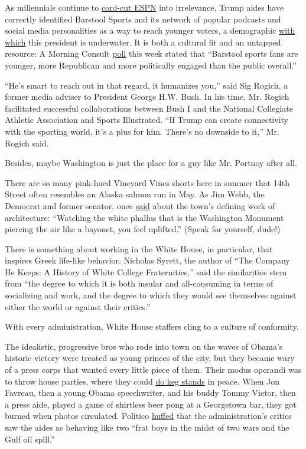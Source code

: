 As millennials continue to
\href{https://www.nytimes.com/2017/11/14/magazine/spurned-by-espn-barstool-sports-is-staying-on-offense.html}{cord-cut
ESPN} into irrelevance, Trump aides have correctly identified Barstool
Sports and its network of popular podcasts and social media
personalities as a way to reach younger voters, a demographic
\href{https://www.nytimes.com/2020/07/01/upshot/poll-trump-defectors-2020-election.html}{with
which} this president is underwater. It is both a cultural fit and an
untapped resource: A Morning Consult
\href{https://morningconsult.com/2020/07/24/barstool-sports-trump-interview-polling/}{poll}
this week stated that ``Barstool sports fans are younger, more
Republican and more politically engaged than the public overall.''

``He's smart to reach out in that regard, it humanizes you,'' said Sig
Rogich, a former media adviser to President George H.W. Bush. In his
time, Mr. Rogich facilitated successful collaborations between Bush I
and the National Collegiate Athletic Association and Sports Illustrated.
``If Trump can create connectivity with the sporting world, it's a plus
for him. There's no downside to it,'' Mr. Rogich said.

Besides, maybe Washington is just the place for a guy like Mr. Portnoy
after all.

There are so many pink-hued Vineyard Vines shorts here in summer that
14th Street often resembles an Alaska salmon run in May. As Jim Webb,
the Democrat and former senator, once
\href{https://www.nytimes.com/2006/11/05/opinion/05brooks.html}{said}
about the town's defining work of architecture: ``Watching the white
phallus that is the Washington Monument piercing the air like a bayonet,
you feel uplifted.'' (Speak for yourself, dude!)

There is something about working in the White House, in particular, that
inspires Greek life-like behavior. Nicholas Syrett, the author of ``The
Company He Keeps: A History of White College Fraternities,'' said the
similarities stem from ``the degree to which it is both insular and
all-consuming in terms of socializing and work, and the degree to which
they would see themselves against either the world or against their
critics.''

With every administration, White House staffers cling to a culture of
conformity.

The idealistic, progressive bros who rode into town on the waves of
Obama's historic victory were treated as young princes of the city, but
they became wary of a press corps that wanted every little piece of
them. Their modus operandi was to throw house parties, where they could
\href{https://www.nytimes.com/2010/05/02/magazine/02obamastaff-t.html}{do
keg stands} in peace. When Jon Favreau, then a young Obama speechwriter,
and his buddy Tommy Vietor, then a press aide, played a game of
shirtless beer pong at a Georgetown bar, they got burned when photos
circulated. Politico
\href{https://www.politico.com/story/2010/06/are-obama-staffers-overexposed-038374}{huffed}
that the administration's critics saw the aides as behaving like two
``frat boys in the midst of two wars and the Gulf oil spill.''


